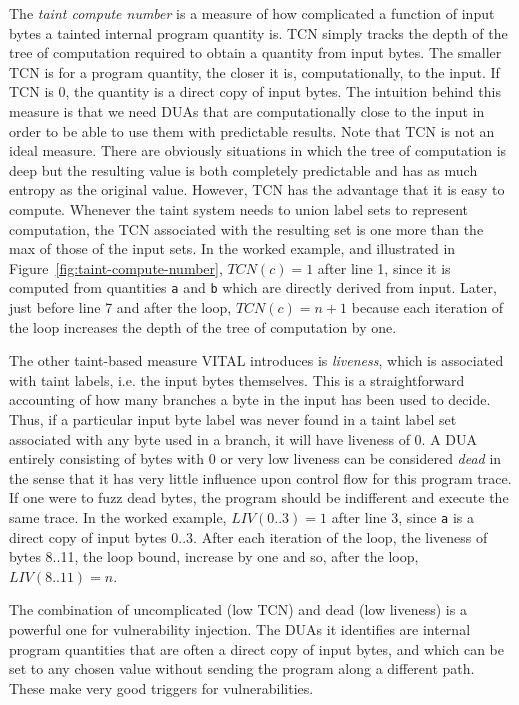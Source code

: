 The \emph{taint compute number} is a measure of how complicated a function of input bytes a tainted internal program quantity is.
TCN simply tracks the depth of the tree of computation required to obtain a quantity from input bytes.
The smaller TCN is for a program quantity, the closer it is, computationally, to the input.
If TCN is 0, the quantity is a direct copy of input bytes.
The intuition behind this measure is that we need DUAs that are computationally close to the input in order to be able to use them with predictable results.
Note that TCN is not an ideal measure.
There are obviously situations in which the tree of computation is deep but the resulting value is both completely predictable and has as much entropy as the original value.
However, TCN has the advantage that it is easy to compute.
Whenever the taint system needs to union label sets to represent computation, the TCN associated with the resulting set is one more than the max of those of the 
input sets.
In the worked example, and illustrated in Figure~\ref{fig:taint-compute-number}, $TCN(c)=1$ after line 1, since it is computed from quantities \verb+a+ and \verb+b+ which are directly derived from input.
Later, just before line 7 and after the loop, $TCN(c)=n+1$ because each iteration of the loop increases the depth of the tree of computation by one.  

The other taint-based measure VITAL introduces is \emph{liveness}, which is associated with taint labels, i.e. the input bytes themselves.
This is a straightforward accounting of how many branches a byte in the input has been used to decide.
Thus, if a particular input byte label was never found in a taint label set associated with any byte used in a branch, it will have liveness of 0.
A DUA entirely consisting of bytes with 0 or very low liveness can be considered \emph{dead} in the sense that it has very little influence upon control flow for this program trace.
If one were to fuzz dead bytes, the program should be indifferent and execute the same trace.  
In the worked example, $LIV(0..3)=1$ after line 3, since \verb+a+ is a direct copy of input bytes 0..3.
After each iteration of the loop, the liveness of bytes 8..11, the loop bound, increase by one and so, after the loop, $LIV(8..11)=n$.

The combination of uncomplicated (low TCN) and dead (low liveness) is a powerful one for vulnerability injection.
The DUAs it identifies are internal program quantities that are often a direct copy of input bytes, and which can be set to any chosen value without sending the program along a different path.  
These make very good triggers for vulnerabilities.

